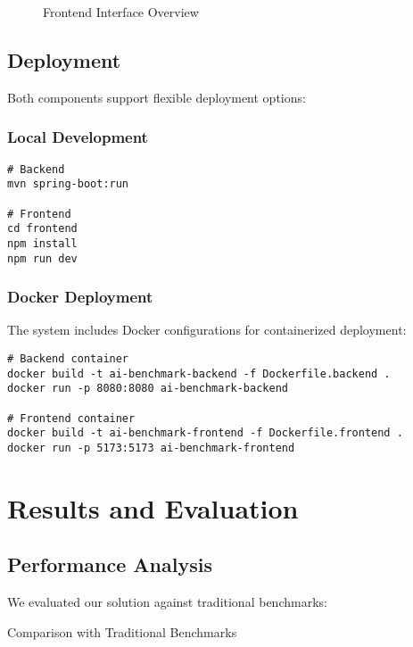 \begin{figure}[h]
    \centering
    \caption{Frontend Interface Overview}
    \label{fig:frontend-ui}
\end{figure}

\section{Deployment}

Both components support flexible deployment options:

\subsection{Local Development}
\begin{verbatim}
# Backend
mvn spring-boot:run

# Frontend
cd frontend
npm install
npm run dev
\end{verbatim}

\subsection{Docker Deployment}
The system includes Docker configurations for containerized deployment:

\begin{verbatim}
# Backend container
docker build -t ai-benchmark-backend -f Dockerfile.backend .
docker run -p 8080:8080 ai-benchmark-backend

# Frontend container
docker build -t ai-benchmark-frontend -f Dockerfile.frontend .
docker run -p 5173:5173 ai-benchmark-frontend
\end{verbatim}

\chapter{Results and Evaluation}

\section{Performance Analysis}

We evaluated our solution against traditional benchmarks:

\begin{table}[h]
    \centering
    \caption{Comparison with Traditional Benchmarks}
    \label{tab:comparison}
\end{table}

